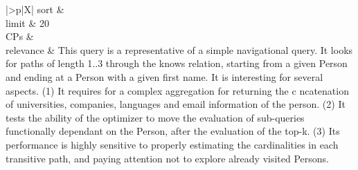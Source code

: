 \begin{tabularx}{\queryCardWidth}{|>{\queryPropertyCell}p{\queryPropertyCellWidth}|X|}
		sort		&
		\innerCardVSpace \\ \hline
	limit & 20 \\ \hline
	CPs &
	 \\ \hline
	relevance &
		\footnotesize This query is a representative of a simple navigational query. It looks for paths of length 1..3 through
the knows relation, starting from a given Person and ending at a Person with a given first name. It is interesting for several
aspects. (1) It requires for a complex aggregation for returning the c ncatenation of universities, companies,
languages and email information of the person. (2) It tests the ability of the optimizer to move the evaluation of
sub-queries functionally dependant on the Person, after the evaluation of the top-k. (3) Its performance is
highly sensitive to properly estimating the cardinalities in each transitive path, and paying attention not to explore
already visited Persons.
 \\ \hline%
\end{tabularx}
\queryCardVSpace

\let\emph\oldemph